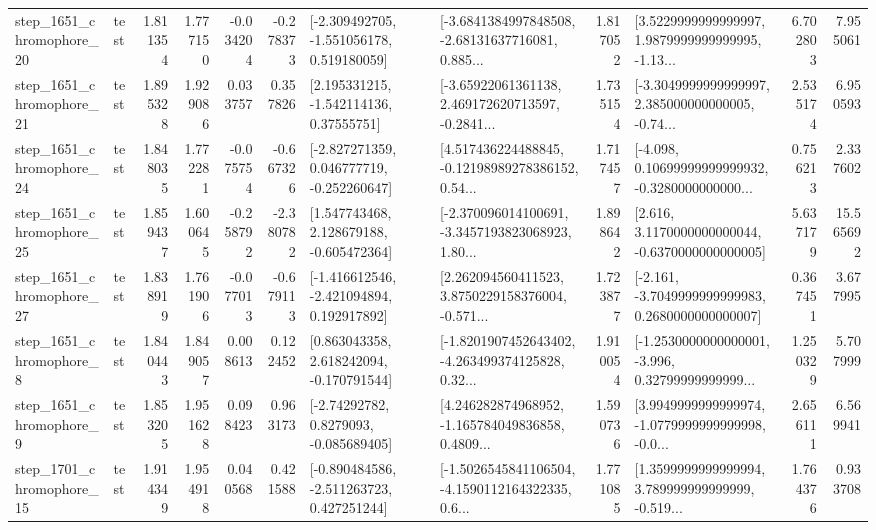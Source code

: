 \begin{tabular}{llrrrrllrlrr}
 step\_1651\_chromophore\_20 &      test &      1.811354 &    1.777150 &     -0.034204 & -0.278373 &   [-2.309492705, -1.551056178, 0.519180059] &  [-3.6841384997848508, -2.68131637716081, 0.885... &       1.817052 &  [3.5229999999999997, 1.9879999999999995, -1.13... &            6.702803 &          7.955061 \\
 step\_1651\_chromophore\_21 &      test &      1.895328 &    1.929086 &      0.033757 &  0.357826 &     [2.195331215, -1.542114136, 0.37555751] &  [-3.65922061361138, 2.469172620713597, -0.2841... &       1.735154 &  [-3.3049999999999997, 2.385000000000005, -0.74... &            2.535174 &          6.950593 \\
 step\_1651\_chromophore\_24 &      test &      1.848035 &    1.772281 &     -0.075754 & -0.667326 &   [-2.827271359, 0.046777719, -0.252260647] &  [4.517436224488845, -0.12198989278386152, 0.54... &       1.717457 &  [-4.098, 0.10699999999999932, -0.3280000000000... &            0.756213 &          2.337602 \\
 step\_1651\_chromophore\_25 &      test &      1.859437 &    1.600645 &     -0.258792 & -2.380782 &    [1.547743468, 2.128679188, -0.605472364] &  [-2.370096014100691, -3.3457193823068923, 1.80... &       1.898642 &   [2.616, 3.1170000000000044, -0.6370000000000005] &            5.637179 &         15.565692 \\
 step\_1651\_chromophore\_27 &      test &      1.838919 &    1.761906 &     -0.077013 & -0.679113 &   [-1.416612546, -2.421094894, 0.192917892] &  [2.262094560411523, 3.8750229158376004, -0.571... &       1.723877 &  [-2.161, -3.7049999999999983, 0.2680000000000007] &            0.367451 &          3.677995 \\
  step\_1651\_chromophore\_8 &      test &      1.840443 &    1.849057 &      0.008613 &  0.122452 &    [0.863043358, 2.618242094, -0.170791544] &  [-1.8201907452643402, -4.263499374125828, 0.32... &       1.910054 &  [-1.2530000000000001, -3.996, 0.32799999999999... &            1.250329 &          5.707999 \\
  step\_1651\_chromophore\_9 &      test &      1.853205 &    1.951628 &      0.098423 &  0.963173 &      [-2.74292782, 0.8279093, -0.085689405] &  [4.246282874968952, -1.165784049836858, 0.4809... &       1.590736 &  [3.9949999999999974, -1.0779999999999998, -0.0... &            2.656111 &          6.569941 \\
 step\_1701\_chromophore\_15 &      test &      1.914349 &    1.954918 &      0.040568 &  0.421588 &   [-0.890484586, -2.511263723, 0.427251244] &  [-1.5026545841106504, -4.1590112164322335, 0.6... &       1.771085 &  [1.3599999999999994, 3.789999999999999, -0.519... &            1.764376 &          0.933708 \\

\end{tabular}
